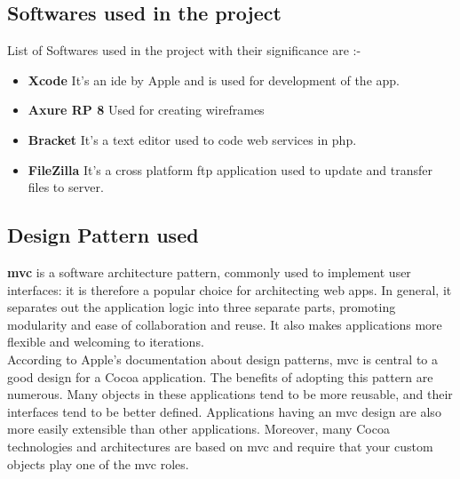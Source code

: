 \newpage

\subsection{Softwares used in the project}

List of Softwares used in the project with their significance are :-

\begin{itemize}
    \item \textbf{Xcode}
    It's an \gls{ide} by Apple and is used for development of the app. \\
    
    \item \textbf{Axure RP 8}
    Used for creating wireframes \\
    
    \item \textbf{Bracket}
    It's a text editor used to code web services in \gls{php}. \\
    
    \item \textbf{FileZilla}
    It's a cross platform \gls{ftp} application used to update and transfer files to server. \\
    
\end{itemize}


\subsection{Design Pattern used}


\textbf{\gls{mvc}} is a software architecture pattern, commonly used to implement user interfaces: it is therefore a popular choice for architecting web apps. In general, it separates out the application logic into three separate parts, promoting modularity and ease of collaboration and reuse. It also makes applications more flexible and welcoming to iterations. \\


According to Apple's documentation about design patterns, \gls{mvc} is central to a good design for a Cocoa application. The benefits of adopting this pattern are numerous. Many objects in these applications tend to be more reusable, and their interfaces tend to be better defined. Applications having an \gls{mvc} design are also more easily extensible than other applications. Moreover, many Cocoa technologies and architectures are based on \gls{mvc} and require that your custom objects play one of the \gls{mvc} roles. \\




